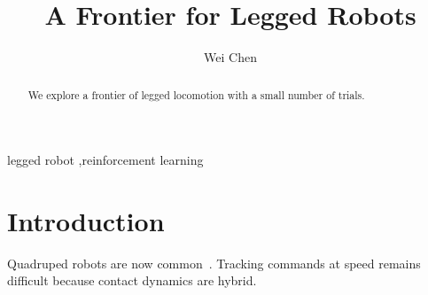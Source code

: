 \documentclass[preprint,12pt]{elsarticle}
\begin{document}
\begin{frontmatter}
\title{A Frontier for Legged Robots}
\author[a]{Wei Chen}
\begin{abstract}
We explore a frontier of legged locomotion with a small number of trials.
\end{abstract}
\begin{keyword}
legged robot \sep reinforcement learning
\end{keyword}
\end{frontmatter}
\section{Introduction}
Quadruped robots are now common~\cite{smith2020}. Tracking commands at speed
remains difficult because contact dynamics are hybrid.


\end{document}
